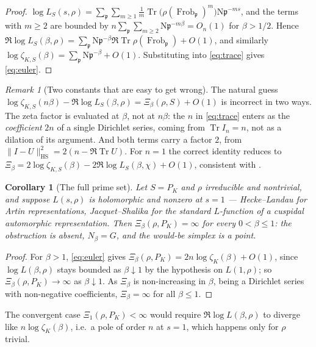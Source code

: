 \documentclass[11pt]{amsart}
\numberwithin{equation}{section}
\newtheorem{corollary}[theorem]{Corollary}
\theoremstyle{definition}
\theoremstyle{remark}
\newtheorem{remark}[theorem]{Remark}
\newcommand{\pp}{\mathfrak{p}}
\newcommand{\Ns}{\mathrm{N}}
\newcommand{\Frob}{\operatorname{Frob}}
\newcommand{\Tr}{\operatorname{Tr}}
\newcommand{\HS}{\mathrm{HS}}
\begin{document}
\begin{proof}
$\log L_S(s,\rho)=\sum_\pp\sum_{m\ge1}\tfrac1m\Tr\bigl(\rho(\Frob_\pp)^m\bigr)\Ns\pp^{-ms}$,
and the terms with $m\ge2$ are bounded by $n\sum_\pp\sum_{m\ge2}\Ns\pp^{-m\beta}=O_n(1)$ for
$\beta>1/2$. Hence
$\Re\log L_S(\beta,\rho)=\sum_\pp\Ns\pp^{-\beta}\Re\Tr\rho(\Frob_\pp)+O(1)$, and similarly
$\log\zeta_{K,S}(\beta)=\sum_\pp\Ns\pp^{-\beta}+O(1)$. Substituting into \eqref{eq:trace}
gives \eqref{eq:euler}.
\end{proof}

\begin{remark}[Two constants that are easy to get wrong]\label{rem:constants}
The natural guess $\log\zeta_{K,S}(n\beta)-\Re\log L_S(\beta,\rho)=\Xi_\beta(\rho,S)+O(1)$ is
incorrect in two ways. The zeta factor is evaluated at $\beta$, not at $n\beta$: the $n$ in
\eqref{eq:trace} enters as the \emph{coefficient} $2n$ of a single Dirichlet series, coming
from $\Tr I_n=n$, not as a dilation of its argument. And both terms carry a factor $2$, from
$\|I-U\|^2_{\HS}=2(n-\Re\Tr U)$. For $n=1$ the correct identity reduces to
$\Xi_\beta=2\log\zeta_{K,S}(\beta)-2\Re\log L_S(\beta,\chi)+O(1)$, consistent with
\cite[Rem.~3.11]{Main}.
\end{remark}

\begin{corollary}[The full prime set]\label{cor:full}
Let $S=P_K$ and $\rho$ irreducible and nontrivial, and suppose $L(s,\rho)$ is holomorphic
and nonzero at $s=1$ --- Hecke--Landau for Artin representations, Jacquet--Shalika
\cite{JS} for the standard $L$-function of a cuspidal automorphic representation. Then
$\Xi_\beta(\rho,P_K)=\infty$ for every $0<\beta\le1$: the obstruction is absent,
$N_\beta=G$, and the would-be simplex is a point.
\end{corollary}

\begin{proof}
For $\beta>1$, \eqref{eq:euler} gives $\Xi_\beta(\rho,P_K)=2n\log\zeta_K(\beta)+O(1)$, since
$\log L(\beta,\rho)$ stays bounded as $\beta\downarrow1$ by the hypothesis on $L(1,\rho)$;
so $\Xi_\beta(\rho,P_K)\to\infty$ as $\beta\downarrow1$. As $\Xi_\beta$ is non-increasing
in $\beta$, being a Dirichlet series with non-negative coefficients, $\Xi_\beta=\infty$ for
all $\beta\le1$.
\end{proof}

The convergent case $\Xi_1(\rho,P_K)<\infty$ would require $\Re\log L(\beta,\rho)$ to
diverge like $n\log\zeta_K(\beta)$, i.e.\ a pole of order $n$ at $s=1$, which happens only
for $\rho$ trivial.
\end{document}
